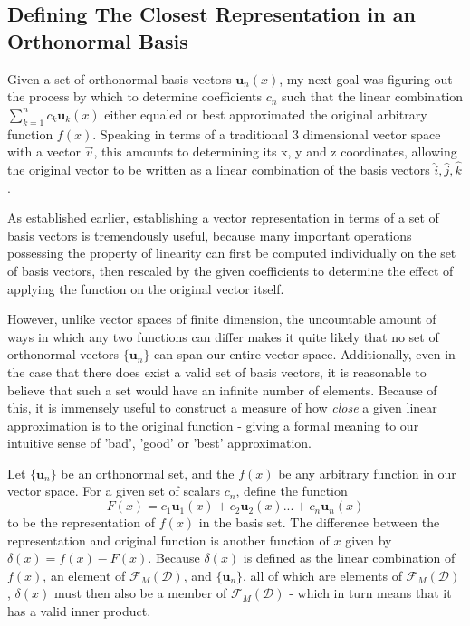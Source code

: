 \documentclass{article}
\newcommand{\B}[1]{\boldsymbol{#1}}
\newcommand*\funcSpace{\mathscr{F}_M(\mathcal{D})}
\newcommand*\basisSet{\{\B{u}_n\}}
\theoremstyle{definition}
\theoremstyle{remark}
\begin{document}
\subsection{Defining The Closest Representation in an Orthonormal Basis}

Given a set of orthonormal basis vectors ${\B{u}_n(x)}$, my next goal was 
figuring out the process by which to determine coefficients ${c_n}$ such 
that the linear combination $\sum_{k=1}^n c_k \B{u}_k(x)$ either equaled
or best approximated the original arbitrary function $f(x)$. Speaking
in terms of a traditional 3 dimensional vector space with a vector $\vec{v}$, this 
amounts to determining its x, y and z coordinates, allowing the original 
vector to be written as a linear combination of the basis vectors $\hat{i}, \hat{j}, \hat{k}$.

As established earlier, establishing a vector representation in terms of a set of 
basis vectors is tremendously useful, because many important operations possessing the 
property of linearity can first be computed individually on the set of basis vectors,
then rescaled by the given coefficients to determine the effect of applying the function 
on the original vector itself. 

However, unlike vector spaces of finite dimension, the uncountable amount of ways
in which any two functions can differ makes it quite likely that no set of orthonormal vectors 
$\{\B{u}_n\}$ can span our entire vector space. Additionally, even in the case that there does exist a valid set of 
basis vectors, it is reasonable to believe that such a set would have an infinite number of 
elements. Because of this, it is immensely useful to construct a measure of how 
\textit{close} a given linear approximation is to the original function - giving a formal meaning to 
our intuitive sense of 'bad', 'good' or 'best' approximation. 

Let $\{\B{u}_n\}$ be an orthonormal set, and the $f(x)$ be any arbitrary function in our vector space. 
For a given set of scalars ${c_n}$, define the function 
\begin{equation}
  F(x) = c_1 \B{u}_1(x) + c_2 \B{u}_2(x) ... + c_n \B{u}_n(x)
  \label{eq:approxFn}
\end{equation}
to be the representation of $f(x)$ in the basis set. 
The difference between the representation and original function is another function of $x$
given by $\delta(x) = f(x) - F(x)$. Because $\delta(x)$ is defined as the linear combination
of $f(x)$, an element of $\funcSpace$, and $\basisSet$, all of which are elements of $\funcSpace$,
$\delta(x)$ must then also be a member of $\funcSpace$ - which in turn means that it has a valid 
inner product. 
\end{document}
